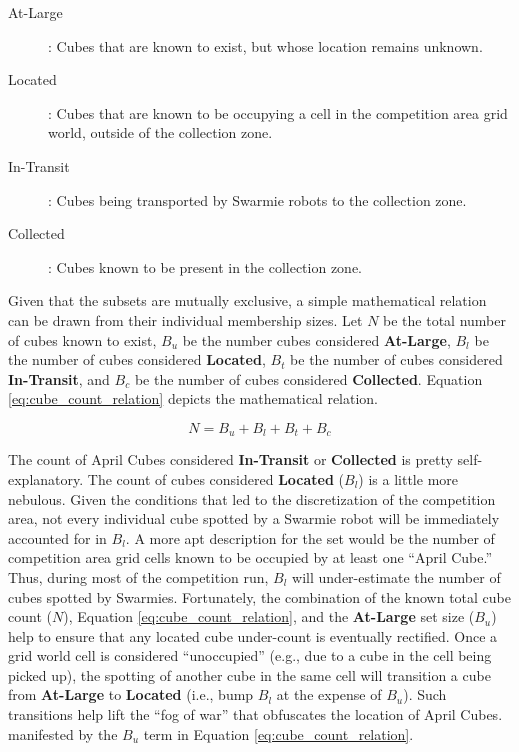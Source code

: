 \documentclass[sigconf,authordraft]{acmart}
\begin{document}
\begin{description}
  \item[At-Large]: Cubes that are known to exist, but whose location remains unknown.
  \item[Located]: Cubes that are known to be occupying a cell in the competition area grid world, outside of the collection zone.
  \item[In-Transit]: Cubes being transported by Swarmie robots to the collection zone.
  \item[Collected]: Cubes known to be present in the collection zone.
\end{description}

Given that the subsets are mutually exclusive, a simple mathematical relation can be drawn from their individual membership sizes. Let $N$ be the total number of cubes known to exist, $B_u$ be the number cubes considered \textbf{At-Large}, $B_l$ be the number of cubes considered \textbf{Located}, $B_t$ be the number of cubes considered \textbf{In-Transit}, and $B_c$ be the number of cubes considered \textbf{Collected}. Equation \ref{eq:cube_count_relation} depicts the mathematical relation.

\begin{equation}\label{eq:cube_count_relation}
  N = B_u + B_l + B_t + B_c
\end{equation}

The count of April Cubes considered \textbf{In-Transit} or \textbf{Collected} is pretty self-explanatory. The count of cubes considered \textbf{Located} ($B_l$) is a little more nebulous. Given the conditions that led to the discretization of the competition area, not every individual cube spotted by a Swarmie robot will be immediately accounted for in $B_l$. A more apt description for the set would be the number of competition area grid cells known to be occupied by at least one ``April Cube.'' Thus, during most of the competition run, $B_l$ will under-estimate the number of cubes spotted by Swarmies. Fortunately, the combination of the known total cube count ($N$), Equation \ref{eq:cube_count_relation}, and the \textbf{At-Large} set size ($B_u$) help to ensure that any located cube under-count is eventually rectified. Once a grid world cell is considered ``unoccupied'' (e.g., due to a cube in the cell being picked up), the spotting of another cube in the same cell will transition a cube from \textbf{At-Large} to \textbf{Located} (i.e., bump $B_l$ at the expense of $B_u$). Such transitions help lift the ``fog of war'' that obfuscates the location of April Cubes. manifested by the $B_u$ term in Equation \ref{eq:cube_count_relation}.
\end{document}
